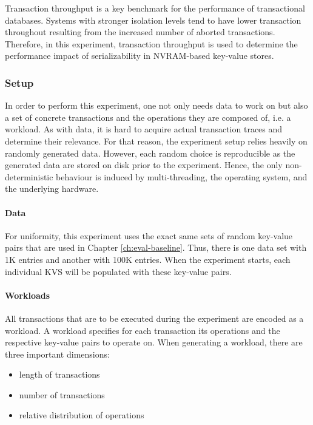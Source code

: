 Transaction throughput is a key benchmark for the performance of transactional
databases. Systems with stronger isolation levels tend to have lower transaction
throughout resulting from the increased number of aborted transactions.
Therefore, in this experiment, transaction throughput is used to determine the
performance impact of serializability in NVRAM-based key-value stores.

\subsubsection{Setup}


In order to perform this experiment, one not only needs data to work on but also
a set of concrete transactions and the operations they are composed of, i.e. a
workload. As with data, it is hard to acquire actual transaction traces and
determine their relevance. For that reason, the experiment setup relies heavily
on randomly generated data. However, each random choice is reproducible as the
generated data are stored on disk prior to the experiment. Hence, the only
non-deterministic behaviour is induced by multi-threading, the operating system,
and the underlying hardware.

\paragraph{Data}

For uniformity, this experiment uses the exact same sets of random key-value
pairs that are used in Chapter \ref{ch:eval-baseline}. Thus, there is one data
set with 1K entries and another with 100K entries. When the experiment starts,
each individual KVS will be populated with these key-value pairs.

\paragraph{Workloads}

All transactions that are to be executed during the experiment are encoded as a
workload. A workload specifies for each transaction its operations and the
respective key-value pairs to operate on. When generating a workload, there are
three important dimensions:

\begin{itemize}
    \item length of transactions
    \item number of transactions
    \item relative distribution of operations
\end{itemize}

